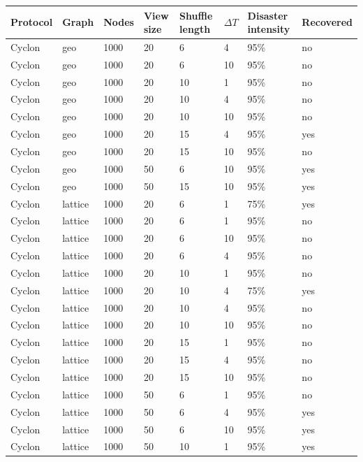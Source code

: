 \documentclass[a4paper]{ifacconf}
\newcommand{\DT}{\ensuremath{{\Delta}T}}
\begin{document}
\begin{table}
    \centering\begin{tabular}{llllllll}
        Protocol & Graph & Nodes & View size & Shuffle length & \DT & Disaster intensity & Recovered \\
        \hline
        Cyclon & geo & 1000 & 20 & 6 & 4 & 95\% & no \\
        Cyclon & geo & 1000 & 20 & 6 & 10 & 95\% & no \\
        Cyclon & geo & 1000 & 20 & 10 & 1 & 95\% & no \\
        Cyclon & geo & 1000 & 20 & 10 & 4 & 95\% & no \\
        Cyclon & geo & 1000 & 20 & 10 & 10 & 95\% & no \\
        Cyclon & geo & 1000 & 20 & 15 & 4 & 95\% & yes \\
        Cyclon & geo & 1000 & 20 & 15 & 10 & 95\% & no \\
        Cyclon & geo & 1000 & 50 & 6 & 10 & 95\% & yes \\
        Cyclon & geo & 1000 & 50 & 15 & 10 & 95\% & yes \\
        Cyclon & lattice & 1000 & 20 & 6 & 1 & 75\% & yes \\
        Cyclon & lattice & 1000 & 20 & 6 & 1 & 95\% & no \\
        Cyclon & lattice & 1000 & 20 & 6 & 10 & 95\% & no \\
        Cyclon & lattice & 1000 & 20 & 6 & 4 & 95\% & no \\
        Cyclon & lattice & 1000 & 20 & 10 & 1 & 95\% & no \\
        Cyclon & lattice & 1000 & 20 & 10 & 4 & 75\% & yes \\
        Cyclon & lattice & 1000 & 20 & 10 & 4 & 95\% & no \\
        Cyclon & lattice & 1000 & 20 & 10 & 10 & 95\% & no \\
        Cyclon & lattice & 1000 & 20 & 15 & 1 & 95\% & no \\
        Cyclon & lattice & 1000 & 20 & 15 & 4 & 95\% & no \\
        Cyclon & lattice & 1000 & 20 & 15 & 10 & 95\% & no \\
        Cyclon & lattice & 1000 & 50 & 6 & 1 & 95\% & no \\
        Cyclon & lattice & 1000 & 50 & 6 & 4 & 95\% & yes \\
        Cyclon & lattice & 1000 & 50 & 6 & 10 & 95\% & yes \\
        Cyclon & lattice & 1000 & 50 & 10 & 1 & 95\% & yes \\

\end{tabular}
\end{table}
\end{document}
